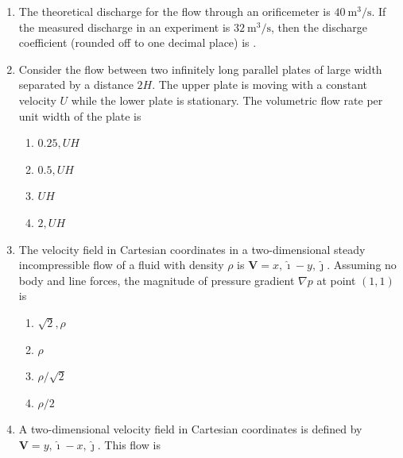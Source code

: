 \documentclass[journal,12pt,onecolumn]{IEEEtran}
\begin{document}
\begin{enumerate}[label=\arabic*)]
\item The theoretical discharge for the flow through an orificemeter is $40\ \mathrm{m^3/s}$. If the measured discharge in an experiment is $32\ \mathrm{m^3/s}$, then the discharge coefficient (rounded off to one decimal place) is \underline{\hspace{2cm}}.
\hfill{} \\

\vspace{0.5cm}

\item Consider the flow between two infinitely long parallel plates of large width separated by a distance $2H$. The upper plate is moving with a constant velocity $U$ while the lower plate is stationary. The volumetric flow rate per unit width of the plate is
\hfill{} \\

\vspace{0.1cm}
\begin{enumerate}[label=\alph*)]
\item $0.25, U H$
\item $0.5, U H$
\item $U H$
\item $2, U H$
\end{enumerate}

\vspace{0.5cm}

\item The velocity field in Cartesian coordinates in a two-dimensional steady incompressible flow of a fluid with density $\rho$ is $\mathbf{V} = x,\hat{\imath} - y,\hat{\jmath}$. Assuming no body and line forces, the magnitude of pressure gradient $\nabla p$ at point $(1,1)$ is
\hfill{} \\

\vspace{0.2cm}
\begin{enumerate}[label=\alph*)]
\item $\sqrt{2},\rho$
\item $\rho$
\item $\rho/\sqrt{2}$
\item $\rho/2$
\end{enumerate}

\vspace{0.5cm}

\item A two-dimensional velocity field in Cartesian coordinates is defined by $\mathbf{V} = y,\hat{\imath} - x,\hat{\jmath}$. This flow is
\hfill{} \\


\end{enumerate}
\end{document}
